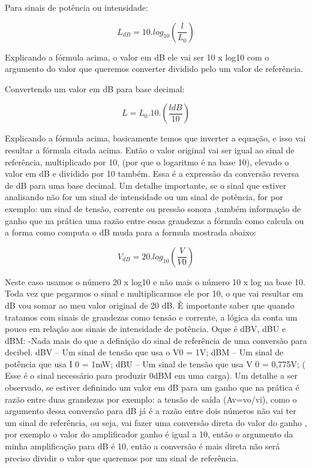     
    Para sinais de potência ou intensidade:
    
   \begin {equation}
   L_{dB} = 10.log_{10}(\frac{l}{ L_{0}})
   \end{equation}
    \newline
    
    Explicando a fórmula acima, o valor em dB ele vai ser 10 x log10 com o argumento do valor que queremos converter dividido pelo um valor de referência.
    \newline
    
    Convertendo um valor em dB para base decimal:
    \newline
    
     \begin {equation}
      L=L_{0}.10.(\frac{ldB}{ {10}})
      \end{equation}
      \newline
      
      Explicando a fórmula acima, basicamente temos que  inverter a equação, e isso vai resultar a fórmula citada acima.
Então o valor original vai ser igual ao sinal de referência, multiplicado por 10, (por que o logaritmo é na base 10), elevado o valor em dB e dividido por 10 também. Essa é a expressão da conversão reversa  de dB para uma base decimal.
Um detalhe importante, se o sinal que estiver analisando não  for um sinal de intensidade ou um sinal de potência, for por exemplo: um sinal de tensão, corrente ou  pressão sonora ,também informação de ganho que na prática uma razão entre essas grandezas a fórmula como calcula ou a forma como computa o dB muda para a formula  mostrada abaixo:
\newline

\begin {equation}
     V_{dB}=20.log_{10}(\frac{V}{ {V0}})
      \end{equation}
\newline   

Neste caso usamos o número 20 x log10 e não mais o número 10 x log na base 10. Toda vez que pegarmos o sinal e multiplicarmos  ele por 10, o que vai resultar em dB vou somar ao meu valor original de 20 dB.
È importante saber que quando tratamos com sinais de grandezas como tensão e corrente, a lógica da conta um pouco em relação aos sinais de intensidade de potência. 
Oque é dBV, dBU e dBM:
-Nada mais do que a definição do sinal de referência de uma conversão para decibel.
dBV – Um sinal de tensão que usa o V0 = 1V;
dBM – Um sinal de potência que usa I 0 = 1mW;
dBU – Um sinal de tensão que usa V 0 = 0,775V; ( Esse é o sinal necessário para produzir 0dBM  em uma carga).
Um detalhe a ser observado, se estiver definindo um valor em dB para um ganho que na prática é razão entre duas grandezas por exemplo: a tensão de saída (Av=vo/vi), como o argumento dessa conversão para dB já é a razão entre dois números não vai ter um sinal de referência, ou seja, vai fazer uma conversão direta do valor do ganho , por exemplo o valor do amplificador ganho é igual a 10, então o argumento da minha amplificação para dB é 10, então a conversão é mais direta não será preciso dividir o valor que queremos por um sinal de referência.
\newpage

